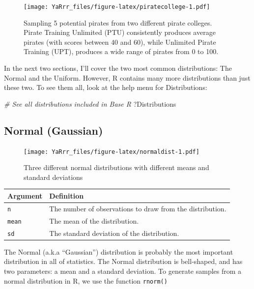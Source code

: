 \documentclass[]{book}
\newenvironment{Shaded}{\begin{snugshade}}{\end{snugshade}}
\newcommand{\CommentTok}[1]{\textcolor[rgb]{0.56,0.35,0.01}{\textit{{#1}}}}
\newcommand{\NormalTok}[1]{{#1}}
\theoremstyle{definition}
\theoremstyle{definition}
\theoremstyle{remark}
\begin{document}
\begin{figure}[htbp]
\centering
\texttt{[image: YaRrr\_files/figure-latex/piratecollege-1.pdf]}
\caption{\label{fig:piratecollege}Sampling 5 potential pirates from two
different pirate colleges. Pirate Training Unlimited (PTU) consistently
produces average pirates (with scores between 40 and 60), while
Unlimited Pirate Training (UPT), produces a wide range of pirates from 0
to 100.}
\end{figure}

In the next two sections, I'll cover the two most common distributions:
The Normal and the Uniform. However, R contains many more distributions
than just these two. To see them all, look at the help menu for
Distributions:

\begin{Shaded}
\begin{Highlighting}[]
\CommentTok{# See all distributions included in Base R}
\NormalTok{?Distributions}
\end{Highlighting}
\end{Shaded}

\subsection{Normal (Gaussian)}\label{normal-gaussian}

\begin{figure}[htbp]
\centering
\texttt{[image: YaRrr\_files/figure-latex/normaldist-1.pdf]}
\caption{\label{fig:normaldist}Three different normal distributions with
different means and standard deviations}
\end{figure}

\begin{longtable}[]{@{}ll@{}}
\toprule
Argument & Definition\tabularnewline
\midrule
\endhead
\texttt{n} & The number of observations to draw from the
distribution.\tabularnewline
\texttt{mean} & The mean of the distribution.\tabularnewline
\texttt{sd} & The standard deviation of the distribution.\tabularnewline
\bottomrule
\end{longtable}

The Normal (a.k.a ``Gaussian'') distribution is probably the most
important distribution in all of statistics. The Normal distribution is
bell-shaped, and has two parameters: a mean and a standard deviation. To
generate samples from a normal distribution in R, we use the function
\texttt{rnorm()}
\end{document}
